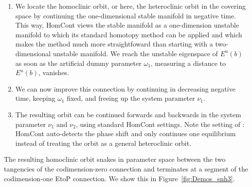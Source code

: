\documentclass[12pt]{report}
\begin{document}
\begin{enumerate}
\item
We locate the homoclinic orbit, or here, the heteroclinic orbit in the
covering space by continuing the one-dimensional stable manifold in
negative time. This way, {\cal HomCont} views the stable manifold as a
one-dimension unstable manifold to which its standard homotopy method
can be applied and which makes the method much more straightfoward
than starting with a two-dimensional unstable manifold.
We reach the unstable eigenspace of $E^u(b)$ as soon as the artificial
dummy parameter $\omega_1$, measuring a distance to $E^u(b)$, vanishes.
\item
We can now improve this connection by continuing in decreasing negative time,
keeping $\omega_1$ fixed, and freeing up the system parameter $\nu_1$.
\item
The resulting orbit can be continued forwards and backwards in the
system parameter $\nu_1$ and $\nu_2$, using standard {\cal HomCont} settings.
Note the setting of : {\cal HomCont} auto-detects the phase
shift and only continues one equilibrium instead of treating
the orbit as a general heteroclinic orbit.
\end{enumerate}

The resulting homoclinic orbit snakes in parameter space between the two
tangencies of the codimension-zero connection and terminates at a
segment of the codimension-one EtoP connection. We show this in
Figure~\ref{fig:Demos_snh3}.
\end{document}
